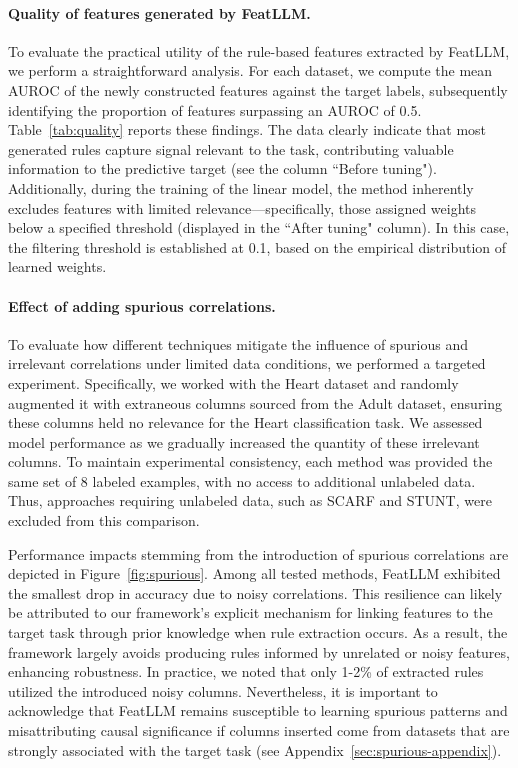 \vspace*{-0.12in}
\paragraph{Quality of features generated by \textsf{FeatLLM}.}
To evaluate the practical utility of the rule-based features extracted by \textsf{FeatLLM}, we perform a straightforward analysis. For each dataset, we compute the mean AUROC of the newly constructed features against the target labels, subsequently identifying the proportion of features surpassing an AUROC of 0.5. Table~\ref{tab:quality} reports these findings. The data clearly indicate that most generated rules capture signal relevant to the task, contributing valuable information to the predictive target (see the column ``Before tuning"). Additionally, during the training of the linear model, the method inherently excludes features with limited relevance—specifically, those assigned weights below a specified threshold (displayed in the ``After tuning" column). In this case, the filtering threshold is established at 0.1, based on the empirical distribution of learned weights.

\vspace*{-0.12in}
\paragraph{Effect of adding spurious correlations.} To evaluate how different techniques mitigate the influence of spurious and irrelevant correlations under limited data conditions, we performed a targeted experiment. Specifically, we worked with the Heart dataset and randomly augmented it with extraneous columns sourced from the Adult dataset, ensuring these columns held no relevance for the Heart classification task. We assessed model performance as we gradually increased the quantity of these irrelevant columns. To maintain experimental consistency, each method was provided the same set of 8 labeled examples, with no access to additional unlabeled data. Thus, approaches requiring unlabeled data, such as SCARF and STUNT, were excluded from this comparison.

Performance impacts stemming from the introduction of spurious correlations are depicted in Figure~\ref{fig:spurious}. Among all tested methods, \textsf{FeatLLM} exhibited the smallest drop in accuracy due to noisy correlations. This resilience can likely be attributed to our framework’s explicit mechanism for linking features to the target task through prior knowledge when rule extraction occurs. As a result, the framework largely avoids producing rules informed by unrelated or noisy features, enhancing robustness. In practice, we noted that only 1-2\% of extracted rules utilized the introduced noisy columns. Nevertheless, it is important to acknowledge that \textsf{FeatLLM} remains susceptible to learning spurious patterns and misattributing causal significance if columns inserted come from datasets that are strongly associated with the target task (see Appendix~\ref{sec:spurious-appendix}).

